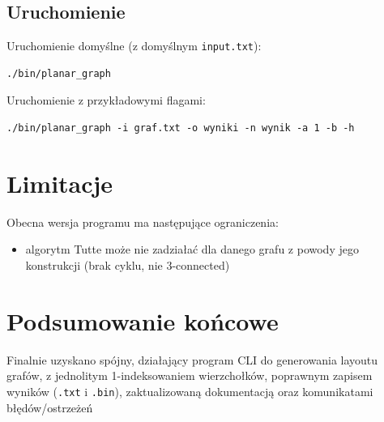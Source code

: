 \documentclass[12pt]{article}
\begin{document}
\subsection{Uruchomienie}
Uruchomienie domyślne (z domyślnym \texttt{input.txt}):
\begin{verbatim}
./bin/planar_graph
\end{verbatim}

Uruchomienie z przykładowymi flagami:
\begin{verbatim}
./bin/planar_graph -i graf.txt -o wyniki -n wynik -a 1 -b -h
\end{verbatim}

\section{Limitacje}
Obecna wersja programu ma następujące ograniczenia:
\begin{itemize}
	\item algorytm Tutte może nie zadziałać dla danego grafu z powody jego konstrukcji (brak cyklu, nie 3-connected)
\end{itemize}

\section{Podsumowanie końcowe}
Finalnie uzyskano spójny, działający program CLI do generowania layoutu grafów,
z jednolitym 1-indeksowaniem wierzchołków, poprawnym zapisem wyników
(\texttt{.txt} i \texttt{.bin}), zaktualizowaną dokumentacją oraz
komunikatami błędów/ostrzeżeń
\end{document}
